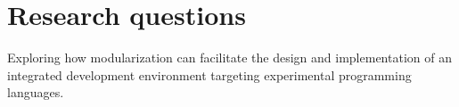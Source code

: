 \section{Research questions}

Exploring how modularization can facilitate the design and implementation of
an integrated development environment targeting experimental programming
languages.
